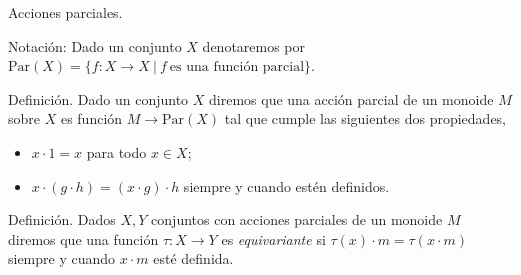 \documentclass[aspectratio=169, 9pt]{beamer}
\newcommand{\Par}{\text{Par}(X)}
\begin{document}

\begin{frame}[fragile]{Acciones parciales.}
	
	
	\bigskip
	
	Notación: Dado un conjunto $X$ denotaremos por $\Par = \{ f: X \to X \ | \  f \ \text{es una función parcial} \}$.
	\pause
	\begin{alertblock}{Definición.}
		Dado un conjunto $X$ diremos que una acción parcial de un monoide $M$ sobre $X$ es función $M \to \Par$ tal que cumple las siguientes dos propiedades,
		\begin{itemize}
			\item $x \cdot 1 = x$ para todo $x \in X$;
			\item $x \cdot (g \cdot h) = (x \cdot g) \cdot h$ siempre y cuando estén definidos.
		\end{itemize} 
	\end{alertblock}
	\pause
	\begin{alertblock}{Definición.}
		Dados $X, Y$ conjuntos con acciones parciales de un monoide $M$ diremos que una función $\tau: X \to Y$ es \emph{equivariante} si $\tau (x) \cdot m = \tau (x \cdot m)$ siempre y cuando $x \cdot m$ esté definida.
	\end{alertblock}
	\pause
\end{frame}
\end{document}
